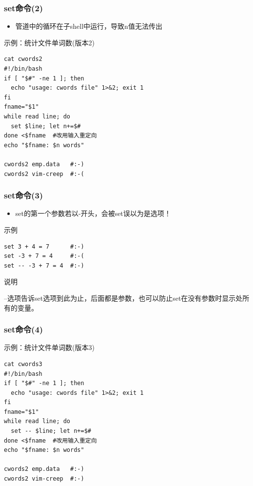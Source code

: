 \documentclass[xcolor=svgnames,presentation]{beamer}
\begin{document}
\begin{frame}[fragile]
\frametitle{set命令(2)}
\label{sec-1-2-45}
\begin{itemize}

\item 管道中的循环在子shell中运行，导致n值无法传出
\label{sec-1-2-45-1}%
\end{itemize} %
\begin{exampleblock}{示例：统计文件单词数(版本2)}
\label{sec-1-2-45-2}


\begin{verbatim}
cat cwords2
#!/bin/bash
if [ "$#" -ne 1 ]; then
  echo "usage: cwords file" 1>&2; exit 1
fi
fname="$1"
while read line; do
  set $line; let n+=$#
done <$fname  #改用输入重定向
echo "$fname: $n words"

cwords2 emp.data   #:-)
cwords2 vim-creep  #:-(
\end{verbatim}
\end{exampleblock}
\end{frame}
\begin{frame}[fragile]
\frametitle{set命令(3)}
\label{sec-1-2-46}
\begin{itemize}

\item set的第一个参数若以-开头，会被set误以为是选项！
\label{sec-1-2-46-1}%
\end{itemize} %
\begin{exampleblock}{示例}
\label{sec-1-2-46-2}


\begin{verbatim}
set 3 + 4 = 7      #:-)
set -3 + 7 = 4     #:-(
set -- -3 + 7 = 4  #:-)
\end{verbatim}
\end{exampleblock}
\begin{block}{说明}
\label{sec-1-2-46-3}

--选项告诉set选项到此为止，后面都是参数，也可以防止set在没有参数时显示处所有的变量。
\end{block}
\end{frame}
\begin{frame}[fragile]
\frametitle{set命令(4)}
\label{sec-1-2-47}
\begin{exampleblock}{示例：统计文件单词数(版本3)}
\label{sec-1-2-47-1}


\begin{verbatim}
cat cwords3
#!/bin/bash
if [ "$#" -ne 1 ]; then
  echo "usage: cwords file" 1>&2; exit 1
fi
fname="$1"
while read line; do
  set -- $line; let n+=$#
done <$fname  #改用输入重定向
echo "$fname: $n words"

cwords2 emp.data   #:-)
cwords2 vim-creep  #:-)
\end{verbatim}
\end{exampleblock}
\end{frame}
\end{document}
